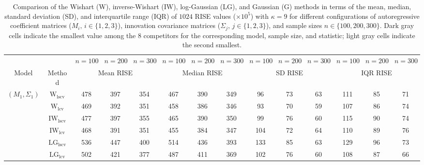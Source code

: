 \begin{table}[!ht]
\caption{Comparison of the Wishart (W), inverse-Wishart (IW), log-Gaussian (LG), and Gaussian (G) methods in terms of the mean, median, standard deviation (SD), and interquartile range (IQR) of $1024$ RISE values ($\times 10^5$) with $\kappa = 9$ for different configurations of autoregressive coefficient matrices ($M_i, \, i\in \{1,2,3\}$), innovation covariance matrices ($\Sigma_j, \, j\in \{1,2,3\}$), and sample sizes $n \in \{100, 200, 300\}$. Dark gray cells indicate the smallest value among the 8 competitors for the corresponding model, sample size, and statistic; light gray cells indicate the second smallest.}
\label{tab:summary}

\fontsize{7.9}{7}\selectfont\renewcommand{\arraystretch}{0}
\setlength{\tabcolsep}{1.2pt}
\setlength{\aboverulesep}{0.35ex}
\setlength{\belowrulesep}{0.35ex}
\centering
{
\begin{tabular}{@{}cc|ccc|ccc|ccc|ccc@{}}
\toprule
\multicolumn{2}{c|}{} & $n = 100$ & $n = 200$ & $n = 300$ & $n = 100$ & $n = 200$ & $n = 300$ & $n = 100$ & $n = 200$ & $n = 300$ & $n = 100$ & $n = 200$ & $n = 300$ \\
\cmidrule(r){1-2}\cmidrule(lr){3-5}\cmidrule(lr){6-8}\cmidrule(lr){9-11}\cmidrule(l){12-14}
Model & Method & \multicolumn{3}{c|}{Mean RISE} & \multicolumn{3}{c|}{Median RISE} & \multicolumn{3}{c|}{SD RISE} & \multicolumn{3}{c}{IQR RISE} \\
\midrule
$(M_1,\Sigma_1)$ & $\mathrm{W}_{\mathrm{lscv}}$ & 478 & 397 & 354 & 467 & 390 & 349 & 96 & 73 & 63 & 111 & 85 & 71 \\ 
 & $\mathrm{W}_{\mathrm{lcv}}$ & \cellcolor{black!10}469 & \cellcolor{black!10}392 & \cellcolor{black!30}351 & \cellcolor{black!10}458 & \cellcolor{black!10}386 & \cellcolor{black!30}346 & 93 & \cellcolor{black!10}70 & \cellcolor{black!10}59 & 107 & 86 & 74 \\ 
 & $\mathrm{IW}_{\mathrm{lscv}}$ & 477 & 397 & 355 & 465 & 390 & 350 & 99 & 76 & 60 & 115 & 90 & 74 \\ 
 & $\mathrm{IW}_{\mathrm{lcv}}$ & \cellcolor{black!30}468 & \cellcolor{black!30}391 & \cellcolor{black!10}351 & \cellcolor{black!30}455 & \cellcolor{black!30}384 & \cellcolor{black!10}347 & 104 & 72 & 64 & 110 & 89 & 76 \\ 
 & $\mathrm{LG}_{\mathrm{lscv}}$ & 536 & 447 & 400 & 514 & 436 & 393 & 133 & 85 & 63 & 129 & 96 & 73 \\ 
 & $\mathrm{LG}_{\mathrm{lcv}}$ & 502 & 421 & 377 & 487 & 411 & 369 & 102 & 76 & 60 & 108 & 87 & \cellcolor{black!10}66 \\ 

\end{tabular}}
\end{table}
